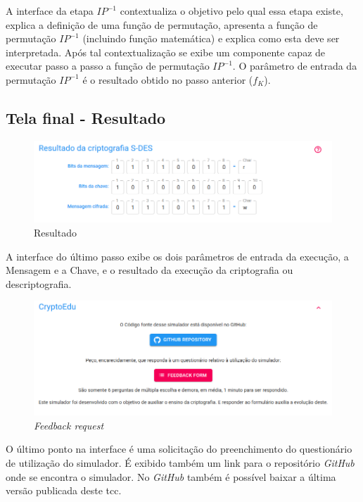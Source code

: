 A interface da etapa \(IP^{-1}\) contextualiza o objetivo pelo qual essa etapa existe, explica a definição de uma função de permutação, apresenta a função de permutação \(IP^{-1}\) (incluindo função matemática) e explica como esta deve ser interpretada. Após tal contextualização se exibe um componente capaz de executar passo a passo a função de permutação \(IP^{-1}\). O parâmetro de entrada da permutação \(IP^{-1}\) é o resultado obtido no passo anterior (\(f_K\)).

\subsection{Tela final - Resultado}

\begin{figure}[H]
    \centering
    \caption{Resultado}
    \includegraphics[width=1\linewidth]{UI/UIResult.png}
\end{figure}

A interface do último passo exibe os dois parâmetros de entrada da execução, a Mensagem e a Chave, e o resultado da execução da criptografia ou descriptografia.

\begin{figure}[H]
    \centering
    \caption{\textit{Feedback request}}
    \includegraphics[width=1\linewidth]{UI/UIFeedback.png}
\end{figure}

O último ponto na interface é uma solicitação do preenchimento do questionário de utilização do simulador. É exibido também um link para o repositório \textit{GitHub} onde se encontra o simulador. No \textit{GitHub} também é possível baixar a última versão publicada deste \acrshort{tcc}.

